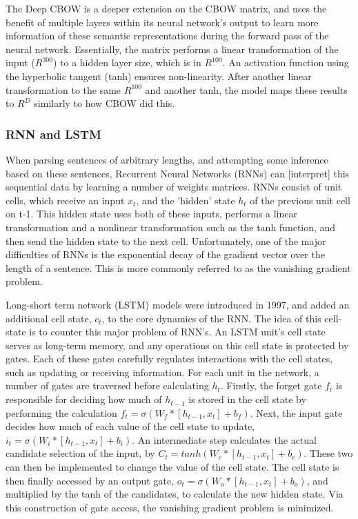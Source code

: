 The Deep CBOW is a deeper extension on the CBOW matrix, and uses the benefit of
multiple layers within its neural network's output to learn more information of
these semantic representations during the forward pass of the neural network.
Essentially, the matrix performs a linear transformation of the input
($R^{300}$) to a hidden layer size, which is in $R^{100}$. An activation
function using the hyperbolic tangent (tanh) ensures non-linearity. After
another linear transformation to the same $R^{100}$ and another tanh, the model
maps these results to $R^D$ similarly to how CBOW did this. 


\subsubsection{RNN and LSTM}
When parsing sentences of arbitrary lengths, and attempting some inference based
on these sentences, Recurrent Neural Networks (RNNs) can [interpret] this
sequential data by learning a number of weights matrices. RNNs consist of unit
cells, which receive an input $x_t$, and the 'hidden' state $h_t$ of the
previous unit cell on t-1. This hidden state uses both of these inputs, performs
a linear transformation and a nonlinear transformation such as the tanh
function, and then send the hidden state to the next cell. Unfortunately, one of
the major difficulties of RNNs is the exponential decay of the gradient vector
over the length of a sentence\cite{bengio1994learning}. This is more commonly
referred to as the vanishing gradient problem.

Long-short term network (LSTM) models \cite{hochreiter1997long} were introduced
in 1997, and added an additional cell state, $c_t$, to the core dynamics of the
RNN. The idea of this cell-state is to counter this major problem of RNN's. An
LSTM unit's cell state serves as long-term memory, and any operations on this
cell state is protected by gates. Each of these gates carefully regulates
interactions with the cell states, such as updating or receiving information.
For each unit in the network, a number of gates are traversed before calculating
$h_t$. Firstly, the forget gate $f_t$ is responsible for deciding how much of
$h_{t-1}$ is stored in the cell state by performing the calculation $f_t =
\sigma(W_f * [h_{t-1}, x_t] + b_f)$. Next, the input gate decides how much of
each value of the cell state to update, $i_t = \sigma(W_i * [h_{t-1}, x_t] +
b_i)$. An intermediate step calculates the actual candidate selection of the
input, by $C_t = tanh(W_c * [h_{t-1}, x_t] + b_c)$. These two can then be
implemented to change the value of the cell state. The cell state is then
finally accessed by an output gate, $o_t = \sigma(W_o * [h_{t-1}, x_t] + b_o)$,
and multiplied by the tanh of the candidates, to calculate the new hidden state.
Via this construction of gate access, the vanishing gradient problem is
minimized.
